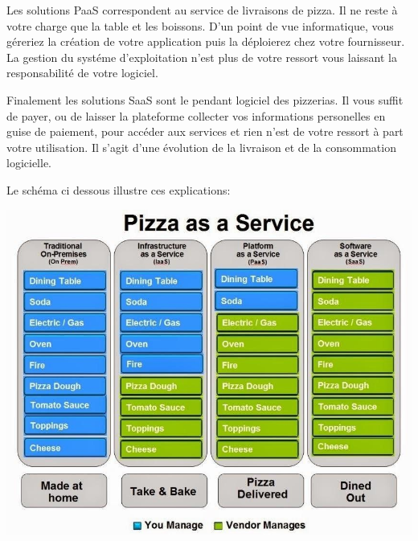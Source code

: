 \documentclass[11pt, a4paper ]{report}
\begin{document}
Les solutions PaaS correspondent au service de livraisons de pizza. Il ne reste à votre charge que la table et les boissons. D'un point de vue informatique, vous géreriez la création de votre application puis la déploierez chez votre fournisseur. La gestion du systéme d'exploitation n'est plus de votre ressort vous laissant la responsabilité de votre logiciel.

Finalement les solutions SaaS sont le pendant logiciel des pizzerias. Il vous suffit de payer, ou de laisser la plateforme collecter vos informations personelles en guise de paiement, pour accéder aux services et rien n'est de votre ressort à part votre utilisation. Il s'agit d'une évolution de la livraison et de la consommation logicielle.

Le schéma ci dessous illustre ces explications:

\includegraphics[scale=0.5]{images/PizzaasaService.jpg}

\end{document}
